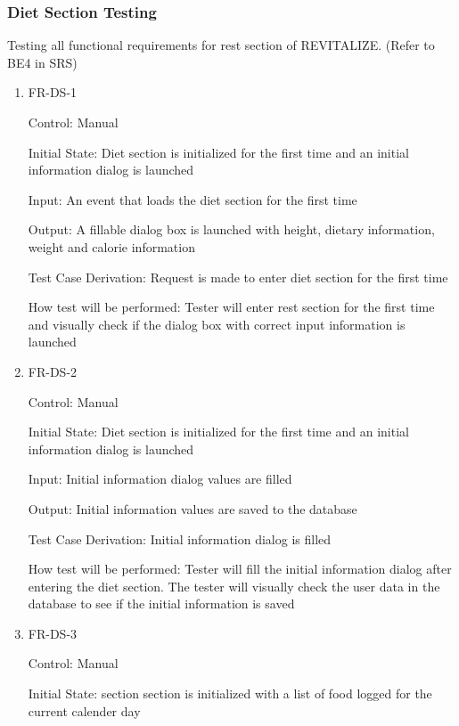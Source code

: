 \documentclass[12pt, titlepage]{article}
\begin{document}
\subsubsection{Diet Section Testing}

Testing all functional requirements for rest section of REVITALIZE. (Refer to BE4 in SRS)

\begin{enumerate}

\item{FR-DS-1\\}

Control: Manual
					
Initial State: Diet section is initialized for the first time and an initial information dialog is launched
					
Input: An event that loads the diet section for the first time
					
Output: A fillable dialog box is launched with height, dietary information, weight and calorie information

Test Case Derivation: Request is made to enter diet section for the first time

How test will be performed: Tester will enter rest section for the first time and visually check if the dialog box with correct input information is launched
					
\item{FR-DS-2\\}

Control: Manual
					
Initial State: Diet section is initialized for the first time and an initial information dialog is launched
					
Input: Initial information dialog values are filled
					
Output: Initial information values are saved to the database

Test Case Derivation: Initial information dialog is filled

How test will be performed: Tester will fill the initial information dialog after entering the diet section. The tester will visually check the user data in the database to see if the initial information is saved
					

\item{FR-DS-3\\}

Control: Manual
					
Initial State: section section is initialized with a list of food logged for the current calender day
					

\end{enumerate}
\end{document}
